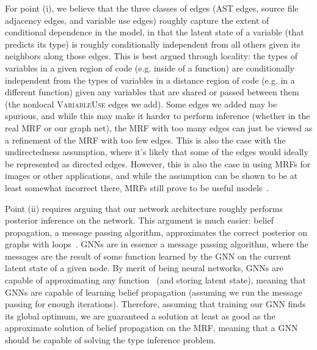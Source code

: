 For point (i), we believe that the three classes of edges (AST edges, source file adjacency edges, and variable use edges) roughly capture the extent of conditional dependence in the model, in that the latent state of a variable (that predicts its type) is roughly conditionally independent from all others given its neighbors along those edges.
This is best argued through locality: the types of variables in a given region of code (e.g. inside of a function) are conditionally independent from the types of variables in a distance region of code (e.g. in a different function) given any variables that are shared or passed between them (the nonlocal \textsc{VariableUse} edges we add).
Some edges we added may be spurious, and while this may make it harder to perform inference (whether in the real MRF or our graph net), the MRF with too many edges can just be viewed as a refinement of the MRF with too few edges.
This is also the case with the undirectedness assumption, where it's likely that some of the edges would ideally be represented as directed edges.
However, this is also the case in using MRFs for images or other applications, and while the assumption can be shown to be at least somewhat incorrect there, MRFs still prove to be useful models~\cite{rangarajan95markov}.

Point (ii) requires arguing that our network architecture roughly performs posterior inference on the network.
This argument is much easier: belief propagation, a message passing algorithm, approximates the correct posterior on graphs with loops~\cite{weiss2000correctness}.
GNNs are in essence a message passing algorithm, where the messages are the result of some function learned by the GNN on the current latent state of a given node.
By merit of being neural networks, GNNs are capable of approximating any function~\cite{hornik1989multilayer} (and storing latent state), meaning that GNNs are capable of learning belief propagation (assuming we run the message passing for enough iterations).
Therefore, assuming that training our GNN finds its global optimum, we are guaranteed a solution at least as good as the approximate solution of belief propagation on the MRF, meaning that a GNN should be capable of solving the type inference problem.

